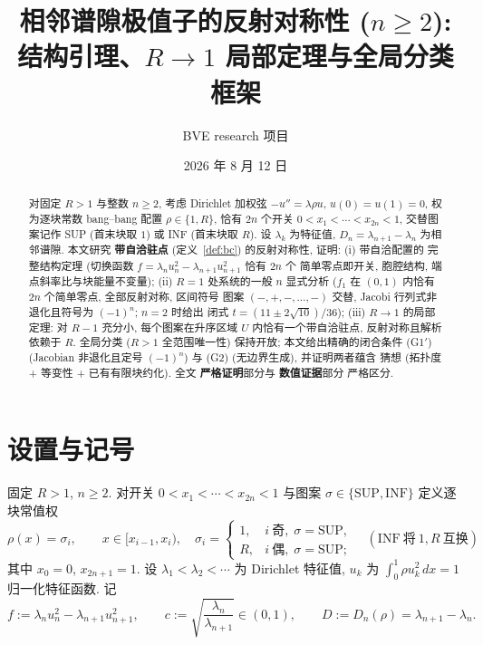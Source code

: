\documentclass[UTF8]{ctexart}
\title{相邻谱隙极值子的反射对称性 ($n\ge2$):\\ 结构引理、$R\to1$ 局部定理与全局分类框架}
\author{BVE research 项目}
\date{2026 年 8 月 12 日}
\newcommand{\STRICT}{\textbf{严格证明}}
\newcommand{\EVIDENCE}{\textbf{数值证据}}
\begin{document}
\maketitle

\begin{abstract}
对固定 $R>1$ 与整数 $n\ge2$, 考虑 Dirichlet 加权弦 $-u''=\lambda\rho u$,
$u(0)=u(1)=0$, 权为逐块常数 bang--bang 配置 $\rho\in\{1,R\}$, 恰有 $2n$ 个开关
$0<x_1<\cdots<x_{2n}<1$, 交替图案记作 SUP (首末块取 $1$) 或 INF (首末块取 $R$).
设 $\lambda_k$ 为特征值, $D_n=\lambda_{n+1}-\lambda_n$ 为相邻谱隙. 本文研究
\textbf{带自洽驻点} (定义~\ref{def:bc}) 的反射对称性, 证明: (i) 带自洽配置的
完整结构定理 (切换函数 $f=\lambda_nu_n^2-\lambda_{n+1}u_{n+1}^2$ 恰有 $2n$ 个
简单零点即开关, 胞腔结构, 端点斜率比与块能量不变量); (ii) $R=1$ 处系统的一般
$n$ 显式分析 ($f_1$ 在 $(0,1)$ 内恰有 $2n$ 个简单零点, 全部反射对称, 区间符号
图案 $(-,+,-,\dots,-)$ 交替, Jacobi 行列式非退化且符号为 $(-1)^n$; $n=2$ 时给出
闭式 $t=(11\pm2\sqrt{10})/36$); (iii) $R\to1$ 的局部定理: 对 $R-1$ 充分小,
每个图案在升序区域 $U$ 内恰有一个带自洽驻点, 反射对称且解析依赖于 $R$.
全局分类 ($R>1$ 全范围唯一性) 保持开放; 本文给出精确的闭合条件
(G1$'$) (Jacobian 非退化且定号 $(-1)^n$) 与 (G2) (无边界生成), 并证明两者蕴含
猜想 (拓扑度 + 等变性 + 已有有限块约化). 全文 \STRICT 部分与 \EVIDENCE 部分
严格区分.
\end{abstract}

\section{设置与记号}\label{sec:setup}

固定 $R>1$, $n\ge2$. 对开关 $0<x_1<\cdots<x_{2n}<1$ 与图案
$\sigma\in\{\mathrm{SUP},\mathrm{INF}\}$ 定义逐块常值权
\begin{equation*}
	\rho(x)=\sigma_i,\qquad x\in[x_{i-1},x_i),\quad
	\sigma_i=\begin{cases}1,& i\ \text{奇},\; \sigma=\mathrm{SUP},\\
	R,& i\ \text{偶},\; \sigma=\mathrm{SUP};\end{cases}
	\quad
	(\mathrm{INF}\ \text{将}\ 1,R\ \text{互换})
\end{equation*}
其中 $x_0=0$, $x_{2n+1}=1$. 设 $\lambda_1<\lambda_2<\cdots$ 为 Dirichlet 特征值,
$u_k$ 为 $\int_0^1\rho u_k^2\,dx=1$ 归一化特征函数. 记
\begin{equation*}
	f:=\lambda_n u_n^2-\lambda_{n+1}u_{n+1}^2,\qquad
	c:=\sqrt{\frac{\lambda_n}{\lambda_{n+1}}}\in(0,1),\qquad
	D:=D_n(\rho)=\lambda_{n+1}-\lambda_n.
\end{equation*}
\end{document}

